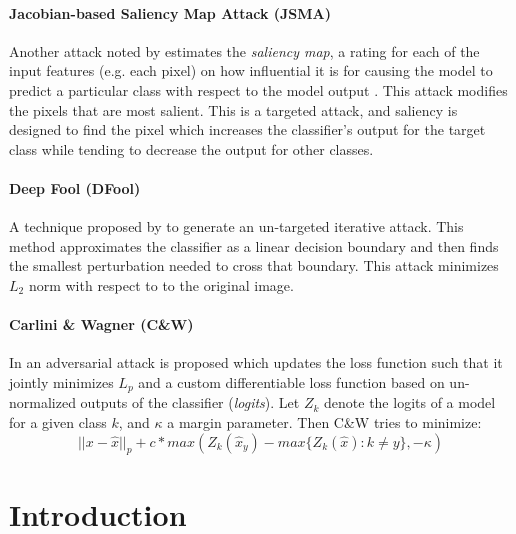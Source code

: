 \paragraph{Jacobian-based Saliency Map Attack (JSMA)} Another attack noted by  \cite{papernot_limitations_2015}
  estimates the \emph{saliency map}, a rating for each of the input features (e.g. each pixel) on how influential it is for causing the model to predict a particular class with respect to the model output \cite{wiyatno2018saliency}. This attack modifies the pixels that are most salient. This is a targeted attack, and saliency is designed to find the pixel which increases the classifier's output for the target class while tending to decrease the output for other classes.

\paragraph{Deep Fool (DFool)} A technique proposed by \cite{moosavi-dezfooli_deepfool:_2015}
  to generate an un-targeted iterative attack. 
This method approximates the classifier as a linear decision boundary and then finds the smallest perturbation needed to cross that boundary.
This attack minimizes $L_2$ norm with respect to  to the original image.

\paragraph{Carlini \& Wagner (C\&W)} In \cite{carlini_towards_2016}
  an adversarial attack is proposed which updates the loss function such that it jointly minimizes $L_p$ and a custom differentiable loss function based on un-normalized outputs of the classifier (\textit{logits}). 
Let $Z_k$ denote the logits of a model for a given class $k$, and $\kappa$ a margin parameter. Then C\&W tries to minimize:
\begin{equation}
|| x - \hat{x} ||_p + c* max\left(Z_k(\hat{x}_y) - max\{Z_k(\hat{x}) : k \neq y\},-\kappa\right)
\end{equation}

\section{Introduction}


